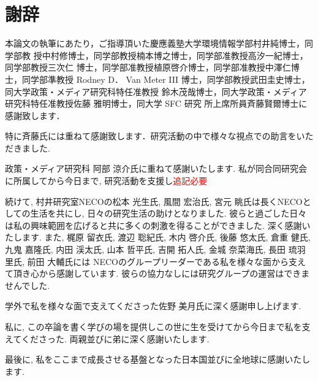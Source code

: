 \chapter*{謝辞}
\label{thanks}

本論文の執筆にあたり，ご指導頂いた慶應義塾大学環境情報学部村井純博士，同学部教
授中村修博士，同学部教授楠本博之博士，同学部准教授高汐一紀博士，同学部教授三次仁
博士，同学部准教授植原啓介博士，同学部准教授中澤仁博士，同学部準教授 Rodney D．
Van Meter III 博士，同学部教授武田圭史博士，同大学政策・メディア研究科特任准教授
鈴木茂哉博士，同大学政策・メディア研究科特任准教授佐藤 雅明博士，同大学 SFC 研究
所上席所員斉藤賢爾博士に感謝致します．

特に斉藤氏には重ねて感謝致します．研究活動の中で様々な視点での助言をいただきました. 

政策・メディア研究科 阿部 涼介氏に重ねて感謝いたします. 私が同合同研究会に所属してから今日まで, 研究活動を支援し\textcolor{red}{追記必要}

続けて, 村井研究室NECOの松本 光生氏, 風間 宏治氏, 宮元 眺氏は長くNECOとしての生活を共にし,
日々の研究生活の助けとなりました. 彼らと過ごした日々は私の興味範囲を広げると共に多くの刺激を得ることができました. 深く感謝いたします.
また, 梶原 留衣氏, 渡辺 聡紀氏, 木内 啓介氏, 後藤 悠太氏, 倉重 健氏, 九鬼 嘉隆氏,
内田 渓太氏, 山本 哲平氏, 吉開 拓人氏, 金城 奈菜海氏, 長田 琉羽里氏, 前田 大輔氏には
NECOのグループリーダーである私を様々な面から支えて頂き心から感謝しています. 彼らの協力なしには研究グループの運営はできませんでした.

学外で私を様々な面で支えてくださった佐野 美月氏に深く感謝申し上げます.

私に, この卒論を書く学びの場を提供しこの世に生を受けてから今日まで私を支えてくださった. 両親並びに弟に深く感謝いたします.

最後に, 私をここまで成長させる基盤となった日本国並びに全地球に感謝いたします.



